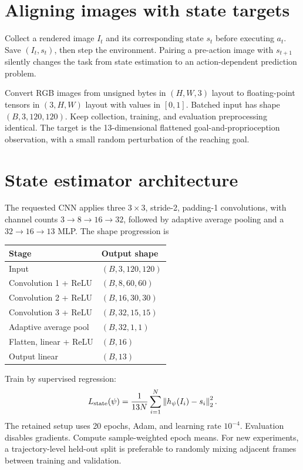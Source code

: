 


\section{Aligning images with state targets}
Collect a rendered image $I_t$ and its corresponding state $s_t$ before
executing $a_t$. Save $(I_t,s_t)$, then step the environment. Pairing a
pre-action image with $s_{t+1}$ silently changes the task from state estimation
to an action-dependent prediction problem.

Convert RGB images from unsigned bytes in $(H,W,3)$ layout to floating-point
tensors in $(3,H,W)$ layout with values in $[0,1]$. Batched input has shape
$(B,3,120,120)$. Keep collection, training, and evaluation preprocessing
identical. The target is the 13-dimensional flattened goal-and-proprioception
observation, with a small random perturbation of the reaching goal.

\section{State estimator architecture}
The requested CNN applies three $3\times3$, stride-2, padding-1 convolutions,
with channel counts $3\to8\to16\to32$, followed by adaptive average pooling
and a $32\to16\to13$ MLP. The shape progression is
\begin{center}
\begin{tabular}{ll}
\toprule Stage & Output shape\\\midrule
Input & $(B,3,120,120)$\\
Convolution 1 + ReLU & $(B,8,60,60)$\\
Convolution 2 + ReLU & $(B,16,30,30)$\\
Convolution 3 + ReLU & $(B,32,15,15)$\\
Adaptive average pool & $(B,32,1,1)$\\
Flatten, linear + ReLU & $(B,16)$\\
Output linear & $(B,13)$\\\bottomrule
\end{tabular}
\end{center}
Train by supervised regression:
\[
 L_{\rm state}(\psi)=\frac1{13N}\sum_{i=1}^N
                                  \left\lVert h_\psi(I_i)-s_i\right\rVert_2^2.
\]
The retained setup uses 20 epochs, Adam, and learning rate $10^{-4}$.
Evaluation disables gradients. Compute sample-weighted epoch means. For
new experiments, a trajectory-level held-out split is preferable to randomly
mixing adjacent frames between training and validation.

